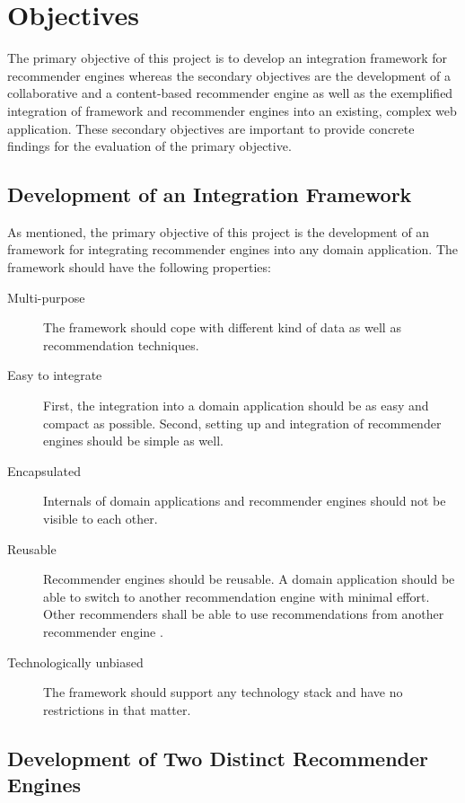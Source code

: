 \section{Objectives}
\label{intro-objectives}

The primary objective of this project is to develop an integration framework for recommender engines whereas the secondary objectives are the development of a collaborative and a content-based recommender engine as well as the exemplified integration of framework and recommender engines into an existing, complex web application. These secondary objectives are important to provide concrete findings for the evaluation of the primary objective.

\subsection{Development of an Integration Framework}
\label{intro-objectives-framework}

As mentioned, the primary objective of this project is the development of an framework for integrating recommender engines into any domain application. The framework should have the following properties:

\begin{description}
    \item[Multi-purpose] The framework should cope with different kind of data as well as recommendation techniques.
    \item[Easy to integrate] First, the integration into a domain application should be as easy and compact as possible. Second, setting up and integration of recommender engines should be simple as well.
    \item[Encapsulated] Internals of domain applications and recommender engines should not be visible to each other.
    \item[Reusable] Recommender engines should be reusable. A domain application should be able to switch to another recommendation engine with minimal effort. Other recommenders shall be able to use recommendations from another recommender engine \cite{manouselis07}.
    \item[Technologically unbiased] The framework should support any technology stack and have no restrictions in that matter.
\end{description}

\subsection{Development of Two Distinct Recommender Engines}
\label{intro-objectives-engines}

